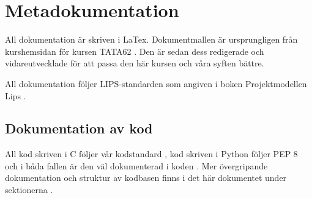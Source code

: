 
\section{Metadokumentation}

All dokumentation är skriven i LaTex. Dokumentmallen är ursprungligen från kurshemsidan för kursen TATA62 . Den är sedan dess redigerade och vidareutvecklade för att passa den här kursen och våra syften bättre.

All dokumentation följer LIPS-standarden som angiven i boken Projektmodellen Lips .

\subsection{Dokumentation av kod}

All kod skriven i C följer vår kodstandard , kod skriven i Python följer PEP 8 och i båda fallen är den väl dokumenterad i koden . Mer övergripande dokumentation och struktur av kodbasen finns i det här dokumentet under sektionerna .
